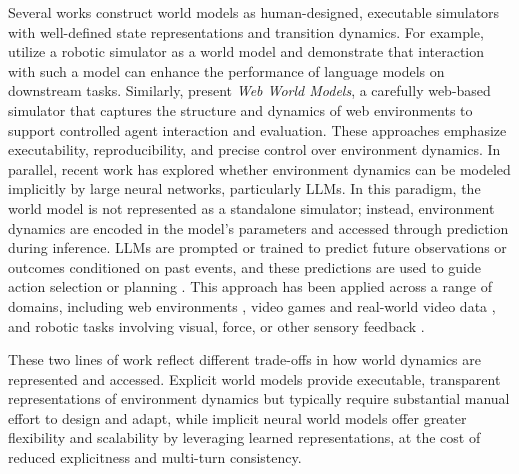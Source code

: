Several works construct world models as human-designed, executable simulators with well-defined state representations and transition dynamics. For example, \cite{xiang2023language} utilize a robotic simulator as a world model and demonstrate that interaction with such a model can enhance the performance of language models on downstream tasks. Similarly, \cite{feng2025web} present \emph{Web World Models}, a carefully web-based simulator that captures the structure and dynamics of web environments to support controlled agent interaction and evaluation. These approaches emphasize executability, reproducibility, and precise control over environment dynamics.
In parallel, recent work has explored whether environment dynamics can be modeled implicitly by large neural networks, particularly LLMs. In this paradigm, the world model is not represented as a standalone simulator; instead, environment dynamics are encoded in the model’s parameters and accessed through prediction during inference. LLMs are prompted or trained to predict future observations or outcomes conditioned on past events, and these predictions are used to guide action selection or planning \cite{hao2023reasoning,gu2024your}. This approach has been applied across a range of domains, including web environments \cite{gu2024your,feng2025web,chae2025wma}, video games and real-world video data \cite{genie3}, and robotic tasks involving visual, force, or other sensory feedback \cite{wu2023daydreamer}.

These two lines of work reflect different trade-offs in how world dynamics are represented and accessed. Explicit world models provide executable, transparent representations of environment dynamics but typically require substantial manual effort to design and adapt, while implicit neural world models offer greater flexibility and scalability by leveraging learned representations, at the cost of reduced explicitness and multi-turn consistency.





